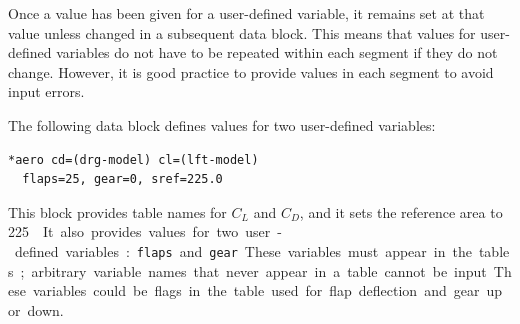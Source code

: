 Once a value has been given for a user-defined variable, it remains set at that value
unless changed in a subsequent data block. This means that values for user-defined
variables do not have to be repeated within each segment if they do not change.
However, it is good practice to provide values in each segment to avoid input errors.

The following  data block defines values for two user-defined
variables:

\begin{lstlisting}[style=taosmanual]
*aero cd=(drg-model) cl=(lft-model)
  flaps=25, gear=0, sref=225.0
\end{lstlisting}

This block provides table names for $C_L$ and $C_D$, and it sets the reference area
to \SI{225}{\square\foot}. It also provides values for two user-defined variables:
\texttt{flaps} and \texttt{gear}. These variables must appear in the tables;
arbitrary variable names that never appear in a table cannot be input. These
variables could be flags in the table used for flap deflection and gear up or down.
